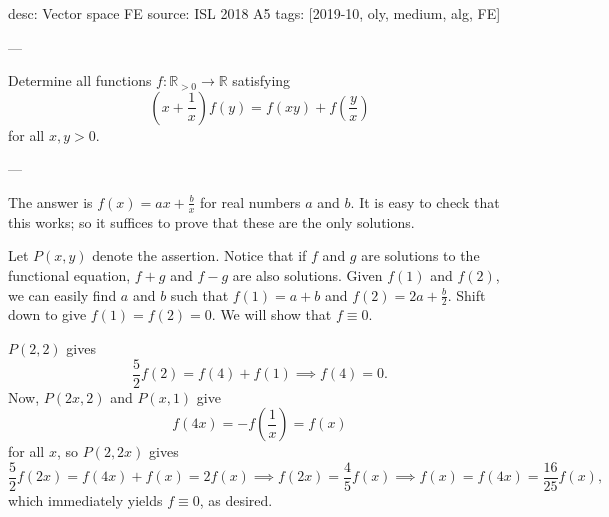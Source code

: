 desc: Vector space FE
source: ISL 2018 A5
tags: [2019-10, oly, medium, alg, FE]

---

Determine all functions $f:\mathbb R_{>0}\to\mathbb  R$ satisfying \[\left(x+\frac1x\right)f(y)=f(xy)+f\left(\frac yx\right)\]
for all $x,y>0$.

---

The answer is $f(x)=ax+\tfrac bx$ for real numbers $a$ and $b$. It is easy to check that this works; so it suffices to prove that these are the only solutions.

Let $P(x,y)$ denote the assertion. Notice that if $f$ and $g$ are solutions to the functional equation, $f+g$ and $f-g$ are also solutions. Given $f(1)$ and $f(2)$, we can easily find $a$ and $b$ such that $f(1)=a+b$ and $f(2)=2a+\tfrac b2$. Shift down to give $f(1)=f(2)=0$. We will show that $f\equiv 0$.

$P(2,2)$ gives \[\frac52f(2)=f(4)+f(1)\implies f(4)=0.\]
Now, $P(2x,2)$ and $P(x,1)$ give \[f(4x)=-f\left(\frac1x\right)=f(x)\]
for all $x$, so $P(2,2x)$ gives \[\frac52f(2x)=f(4x)+f(x)=2f(x)\implies f(2x)=\frac45f(x)\implies f(x)=f(4x)=\frac{16}{25}f(x),\]
which immediately yields $f\equiv0$, as desired.
